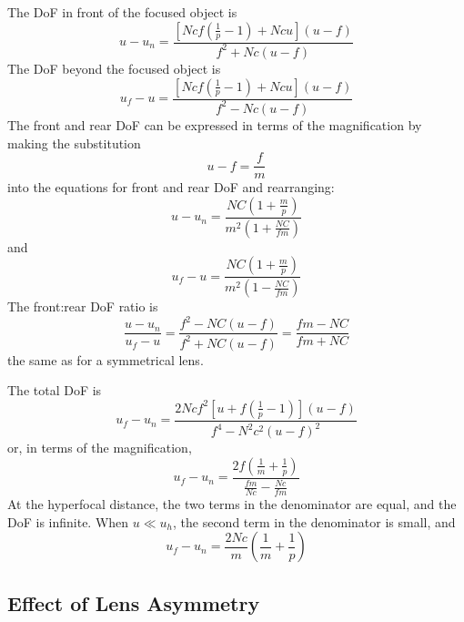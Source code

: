 \documentclass[11pt, oneside]{scrartcl}   	%
\begin{document}
The DoF in front of the focused object is
\begin{equation}
  \label{eq:98}
  u-u_n=\frac{\left[N\!cf\left(\frac 1p-1\right) + N\!cu\right](u-f)}{f^2
    + N\!c(u-f)}
\end{equation}
The DoF beyond the focused object is
\begin{equation}
u_f-u=\frac{\left[N\!cf\left(\frac 1 p -1\right) + N\!cu\right](u-f)}{f^2-N\!c(u-f)}
   \label{eq:dofbfo}
\end{equation}
The front and rear DoF can be expressed in terms of the magnification by making the substitution
\begin{equation}
u-f = \frac f m
\end{equation}
 into the equations for front and rear DoF and rearranging:
\begin{equation}
u-u_n = \frac{NC\left(1+ \frac m p\right)}{m^2\left(1+\frac{NC}{fm}\right)}
\end{equation}
and
\begin{equation}
u_f-u = \frac{NC\left(1+ \frac m p\right)}{m^2\left(1-\frac{NC}{fm}\right)}
\end{equation}
The front:rear DoF ratio is 
\begin{equation}
   \frac{u - u_n}{u_f-u} =  \frac{f^2 - NC(u-f)}{f^2 + NC(u-f)} = \frac{fm - NC}{fm + NC}
   \label{eq:frdofratio}
\end{equation}
the same as for a symmetrical lens.

The total DoF is
\begin{equation}
   u_f - u_n = \frac{2N\!cf^2\left[u+f\left(\frac 1 p -1 \right)\right](u-f)}{f^4-N^2c^2(u-f)^2}
   \label{eq:totdof}
\end{equation}
or, in terms of the magnification,
\begin{equation}
   u_f - u_n = \frac{2f\left(\frac 1 m + \frac 1 p\right)}{\frac{fm}{N\!c}-\frac{N\!c}{fm}}
   \label{eq:magdof}
\end{equation}
At the hyperfocal distance, the two terms in the denominator are equal, and the DoF is
 infinite. When $u\ll u_h$, the second term in the denominator is small, and
\begin{equation}
   u_f - u_n = \frac{2N\!c}{m}\left(\frac 1 m + \frac 1 p\right)
   \label{eq:DOFapprox}
\end{equation}


\subsection{Effect of Lens Asymmetry}
\end{document}
